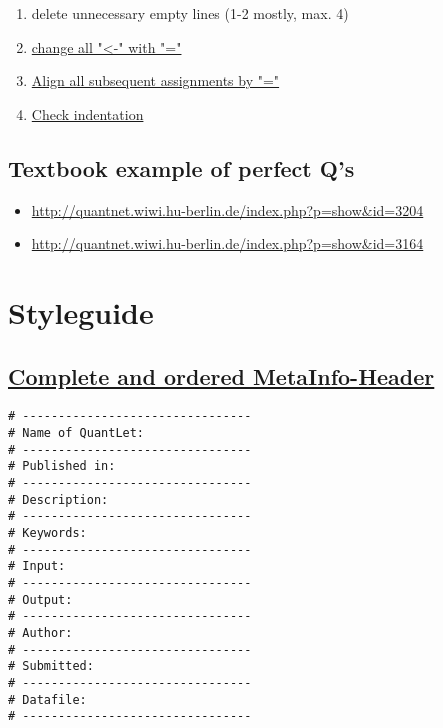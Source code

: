 \documentclass{article}
\begin{document}
\begin{enumerate}
\begin {enumerate}
\begin{enumerate}
				\item check that the code still works properly	
			\end{enumerate}
		\item delete unnecessary empty lines (1-2 mostly, max. 4)
		\item \label{all-equal-ini}\hyperref[all-equal]{change all "\textless -" with "="}
		\item \label{align-assign-ini}\hyperref[align-assign]{Align all subsequent assignments by "="}
		\item \label{indentation-ini}\hyperref[indentation]{Check indentation}
	\end{enumerate}
\end{enumerate}

\subsection*{Textbook example of perfect Q's}
\begin{itemize}
	\item \url{http://quantnet.wiwi.hu-berlin.de/index.php?p=show&id=3204}
	\item \url{http://quantnet.wiwi.hu-berlin.de/index.php?p=show&id=3164}
\end{itemize}

\section*{Styleguide}

\subsection{\label{MetaInfo}\hyperref[MetaInfo-ini]{Complete and ordered MetaInfo-Header}}
\begin{lstlisting}[frame=single]
# --------------------------------
# Name of QuantLet:
# --------------------------------
# Published in:
# --------------------------------
# Description:
# --------------------------------
# Keywords:
# --------------------------------
# Input:
# --------------------------------
# Output:
# --------------------------------
# Author:
# --------------------------------
# Submitted:
# --------------------------------
# Datafile:
# --------------------------------
\end{lstlisting}
\end{document}
